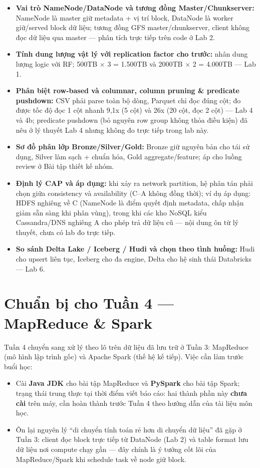 \documentclass[12pt,a4paper,oneside]{article}
\begin{document}
\begin{itemize}
  \item \textbf{Vai trò NameNode/DataNode và tương đồng Master/Chunkserver:} NameNode là master giữ metadata + vị trí block, DataNode là worker giữ/served block dữ liệu; tương đồng GFS master/chunkserver, client không đọc dữ liệu qua master --- phân tích trực tiếp trên code ở Lab 2.
  \item \textbf{Tính dung lượng vật lý với replication factor cho trước:} nhân dung lượng logic với RF; 500TB $\times$ 3 = 1.500TB và 2000TB $\times$ 2 = 4.000TB --- Lab 1.
  \item \textbf{Phân biệt row-based và columnar, column pruning \& predicate pushdown:} CSV phải parse toàn bộ dòng, Parquet chỉ đọc đúng cột; đo được tốc độ đọc 1 cột nhanh 9,1x (5 cột) và 26x (20 cột, đọc 2 cột) --- Lab 4 và 4b; predicate pushdown (bỏ nguyên row group không thỏa điều kiện) đã nêu ở lý thuyết Lab 4 nhưng không đo trực tiếp trong lab này.
  \item \textbf{Sơ đồ phân lớp Bronze/Silver/Gold:} Bronze giữ nguyên bản cho tái sử dụng, Silver làm sạch + chuẩn hóa, Gold aggregate/feature; áp cho luồng review ở Bài tập thiết kế nhóm.
  \item \textbf{Định lý CAP và áp dụng:} khi xảy ra network partition, hệ phân tán phải chọn giữa consistency và availability (C--A không đồng thời); ví dụ áp dụng: HDFS nghiêng về C (NameNode là điểm quyết định metadata, chấp nhận giảm sẵn sàng khi phân vùng), trong khi các kho NoSQL kiểu Cassandra/DNS nghiêng A cho phép trả dữ liệu cũ --- nội dung ôn từ lý thuyết, chưa có lab đo trực tiếp.
  \item \textbf{So sánh Delta Lake / Iceberg / Hudi và chọn theo tình huống:} Hudi cho upsert liên tục, Iceberg cho đa engine, Delta cho hệ sinh thái Databricks --- Lab 6.
\end{itemize}

\section{Chuẩn bị cho Tuần 4 --- MapReduce \& Spark}

Tuần 4 chuyển sang xử lý theo lô trên dữ liệu đã lưu trữ ở Tuần 3: MapReduce (mô hình lập trình gốc) và Apache Spark (thế hệ kế tiếp). Việc cần làm trước buổi học:

\begin{itemize}
  \item Cài \textbf{Java JDK} cho bài tập MapReduce và \textbf{PySpark} cho bài tập Spark; trạng thái trung thực tại thời điểm viết báo cáo: hai thành phần này \textbf{chưa cài} trên máy, cần hoàn thành trước Tuần 4 theo hướng dẫn của tài liệu môn học.
  \item Ôn lại nguyên lý ``di chuyển tính toán rẻ hơn di chuyển dữ liệu'' đã gặp ở Tuần 3: client đọc block trực tiếp từ DataNode (Lab 2) và table format lưu dữ liệu nơi compute chạy gần --- đây chính là ý tưởng cốt lõi của MapReduce/Spark khi schedule task về node giữ block.
\end{itemize}
\end{document}
